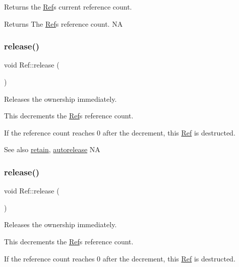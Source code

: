 Returns the \hyperlink{classRef}{Ref}\textquotesingle{}s current reference count.

\begin{DoxyReturn}{Returns}
The \hyperlink{classRef}{Ref}\textquotesingle{}s reference count.  NA 
\end{DoxyReturn}
\mbox{\label{classRef_a6c8528cd8731765688943496c2eb3907}} 
\subsubsection{\texorpdfstring{release()}{release()}\hspace{0.1cm}{\footnotesize\ttfamily [1/2]}}
{\footnotesize\ttfamily void Ref\+::release (\begin{DoxyParamCaption}{ }\end{DoxyParamCaption})}

Releases the ownership immediately.

This decrements the \hyperlink{classRef}{Ref}\textquotesingle{}s reference count.

If the reference count reaches 0 after the decrement, this \hyperlink{classRef}{Ref} is destructed.

\begin{DoxySeeAlso}{See also}
\hyperlink{classRef_a7d182cae1be1e80a9884cacd6ff9cb01}{retain}, \hyperlink{classRef_a065f6972ebb82de3e2143cbf10a7ac2d}{autorelease}  NA 
\end{DoxySeeAlso}
\mbox{\label{classRef_a6c8528cd8731765688943496c2eb3907}} 
\subsubsection{\texorpdfstring{release()}{release()}\hspace{0.1cm}{\footnotesize\ttfamily [2/2]}}
{\footnotesize\ttfamily void Ref\+::release (\begin{DoxyParamCaption}{ }\end{DoxyParamCaption})}

Releases the ownership immediately.

This decrements the \hyperlink{classRef}{Ref}\textquotesingle{}s reference count.

If the reference count reaches 0 after the decrement, this \hyperlink{classRef}{Ref} is destructed.

